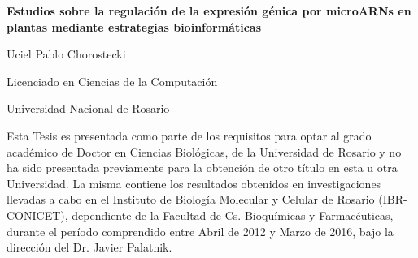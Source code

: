 
\begin{declaration}

\begin{center}

{\Large \bfseries{Estudios sobre la regulación de la expresión génica por microARNs en plantas mediante estrategias bioinformáticas} \par} 
\vspace*{3em}

{\Large Uciel Pablo Chorostecki \par} 
\vspace*{2em}
{\Large Licenciado en Ciencias de la Computación \par} 
\vspace*{.5em}
{\Large Universidad Nacional de Rosario\par} 
\vspace*{3em}

\end{center}


Esta Tesis es presentada como parte de los requisitos para optar al grado académico de Doctor en Ciencias Biológicas, 
 de la Universidad de Rosario y no ha sido presentada previamente para la obtención de otro título en esta u otra Universidad. 
 La misma contiene los resultados obtenidos en investigaciones llevadas a cabo en el Instituto de Biología Molecular y Celular de Rosario (IBR-CONICET),
 dependiente de la Facultad de Cs. Bioquímicas y Farmacéuticas, durante el período comprendido entre Abril de 2012 y Marzo de 2016, 
 bajo la dirección del Dr. Javier Palatnik.



\end{declaration}

